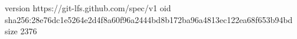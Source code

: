 version https://git-lfs.github.com/spec/v1
oid sha256:28e76dc1e5264e2d4f8a60f96a2444bd8b172ba96a4813ec122ea68f653b94bd
size 2376
